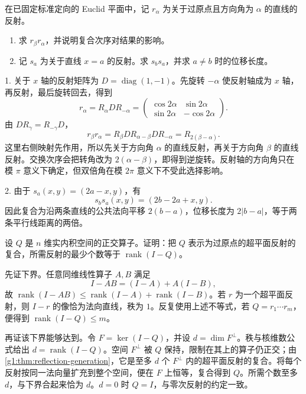 \begin{exercise}
	\label{g1:ex:two-reflections}
	在已固定标准定向的 Euclid 平面中，记 \(r_\alpha\) 为关于过原点且方向角为 \(\alpha\) 的直线的反射。
	\begin{enumerate}
		\item 求 \(r_\beta r_\alpha\)，并说明复合次序对结果的影响。
		\item 记 \(s_a\) 为关于直线 \(x=a\) 的反射。求 \(s_b s_a\)，并求 \(a\ne b\) 时的位移长度。
	\end{enumerate}
\end{exercise}
\begin{solution}
	1. 关于 \(x\) 轴的反射矩阵为 \(D=\operatorname{diag}(1,-1)\)。先旋转 \(-\alpha\) 使反射轴成为 \(x\) 轴，再反射，最后旋转回去，得到
	\[
		r_\alpha=R_\alpha D R_{-\alpha}
		=\begin{pmatrix}
			\cos2\alpha&\sin2\alpha\\
			\sin2\alpha&-\cos2\alpha
		\end{pmatrix}.
	\]
	由 \(DR_\gamma=R_{-\gamma}D\)，
	\[
		r_\beta r_\alpha
		=R_\beta D R_{\alpha-\beta}D R_{-\alpha}
		=R_{2(\beta-\alpha)}.
	\]
	这里右侧映射先作用，所以先关于方向角 \(\alpha\) 的直线反射，再关于方向角 \(\beta\) 的直线反射。交换次序会把转角改为 \(2(\alpha-\beta)\)，即得到逆旋转。反射轴的方向角只在模 \(\pi\) 意义下确定，但双倍角在模 \(2\pi\) 意义下不受此选择影响。

	2. 由于 \(s_a(x,y)=(2a-x,y)\)，有
	\[
		s_b s_a(x,y)=(2b-2a+x,y).
	\]
	因此复合为沿两条直线的公共法向平移 \(2(b-a)\)，位移长度为 \(2|b-a|\)，等于两条平行线距离的两倍。
\end{solution}

\begin{exercise}
	\label{g1:ex:minimal-reflections}
	设 \(Q\) 是 \(n\) 维实内积空间的正交算子。证明：把 \(Q\) 表示为过原点的超平面反射的复合，所需反射的最少个数等于 \(\operatorname{rank}(I-Q)\)。
\end{exercise}
\begin{solution}
	先证下界。任意同维线性算子 \(A,B\) 满足
	\[
		I-AB=(I-A)+A(I-B),
	\]
	故 \(\operatorname{rank}(I-AB)\leq\operatorname{rank}(I-A)+\operatorname{rank}(I-B)\)。若 \(r\) 为一个超平面反射，则 \(I-r\) 的像恰为法向直线，秩为 \(1\)。反复使用上述不等式，若 \(Q=r_1\cdots r_m\)，便得到 \(\operatorname{rank}(I-Q)\leq m\)。

	再证该下界能够达到。令 \(F=\ker(I-Q)\)，并设 \(d=\dim F^\perp\)。秩与核维数公式给出 \(d=\operatorname{rank}(I-Q)\)。空间 \(F^\perp\) 被 \(Q\) 保持，限制在其上的算子仍正交；由\cref{g1:thm:reflection-generation}，它是至多 \(d\) 个 \(F^\perp\) 内的超平面反射的复合。将每个反射按同一法向量扩充到整个空间，便在 \(F\) 上恒等，复合得到 \(Q\)。所需个数至多 \(d\)，与下界合起来恰为 \(d\)。\(d=0\) 时 \(Q=I\)，与零次反射的约定一致。
\end{solution}

